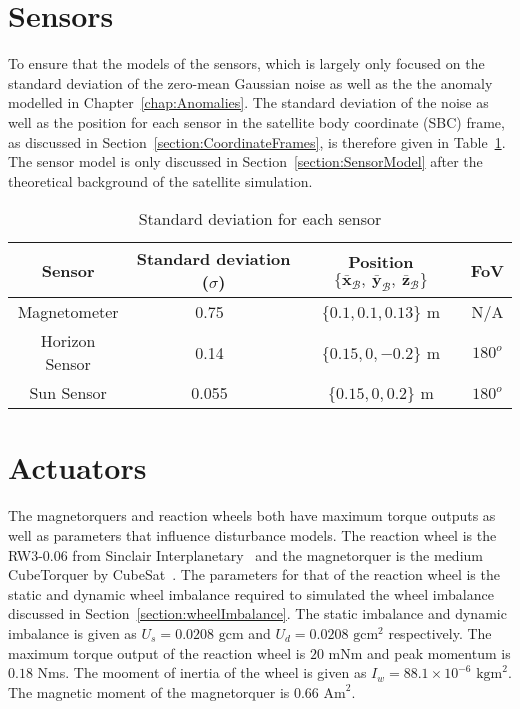 \section{Sensors}
\label{section:SensorParameters}
To ensure that the models of the sensors, which is largely only focused on the standard deviation of the zero-mean Gaussian noise as well as the the anomaly modelled in Chapter~\ref{chap:Anomalies}. The standard deviation of the noise as well as the position for each sensor in the satellite body coordinate (SBC) frame, as discussed in Section~\ref{section:CoordinateFrames}, is therefore given in Table~\ref{Table:SensorNoise}. The sensor model is only discussed in Section~\ref{section:SensorModel} after the theoretical background of the satellite simulation.
\begin{table}[h!t!b]
	\centering
	\caption{\label{Table:SensorNoise}Standard deviation for each sensor}
	\begin{tabular}{c c c c}
		\hline\hline
		\textbf{Sensor} & Standard deviation ($\sigma$) & Position $\{\bar{\mathbf{x}}_{\mathcal{B}},~\bar{\mathbf{y}}_{\mathcal{B}},~\bar{\mathbf{z}}_{\mathcal{B}}\}$ & FoV\\ \hline
		Magnetometer & 0.75~\cite{MagnetometerAAC} & $\{0.1, 0.1, 0.13\}$ m & N/A\\
		Horizon Sensor & 0.14~\cite{wessels2018infrared} & $\{0.15, 0, -0.2\}$ m & $180^o$\\
		Sun Sensor & 0.055~\cite{SputnixSunSensor} & $\{0.15, 0, 0.2\}$ m & $180^o$\\
		\hline\hline
	\end{tabular}
\end{table}

\section{Actuators}
The magnetorquers and reaction wheels both have maximum torque outputs as well as parameters that influence disturbance models. The reaction wheel is the RW3-0.06 from Sinclair Interplanetary~\cite{reactionWheelSinclair} and the magnetorquer is the medium CubeTorquer by CubeSat~\cite{magnetorquerCubeSpace}. The parameters for that of the reaction wheel is the static and dynamic wheel imbalance required to simulated the wheel imbalance discussed in Section~\ref{section:wheelImbalance}. The static imbalance and dynamic imbalance is given as $U_s = 0.0208\text{ gcm}$ and $U_d = 0.0208\text{ gcm}^2$ respectively. The maximum torque output of the reaction wheel is $\num{20}$ mNm and peak momentum is $\num{0.18}$ Nms. The mooment of inertia of the wheel is given as $I_w = 88.1 \times 10^{-6} \text{ kgm}^2$. The magnetic moment of the magnetorquer is $\num{0.66}\text{ Am}^2$.

